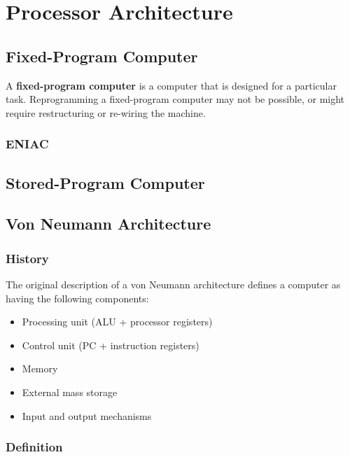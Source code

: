 \chapter{Processor Architecture}

\section{Fixed-Program Computer}

A \textbf{fixed-program computer} is a computer that is designed for a particular task. Reprogramming a fixed-program computer may not be possible, or might require restructuring or re-wiring the machine.

\subsection{ENIAC}



\section{Stored-Program Computer}



\section{Von Neumann Architecture}

\subsection{History}

The original description of a von Neumann architecture defines a computer as having the following components:

\begin{itemize}
	\item Processing unit (ALU + processor registers)
	\item Control unit (PC + instruction registers)
	\item Memory
	\item External mass storage
	\item Input and output mechanisms
\end{itemize}

\subsection{Definition}

